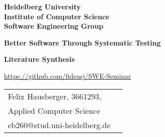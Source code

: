 \documentclass[
     12pt,         %
     a4paper,      %
     BCOR10mm,     %
     DIV14,        %
     ]{article}
\begin{document}
\begin{titlepage}

\vspace*{1cm}
\begin{center}
\textbf{ 
\Large Heidelberg University\\
\smallskip
\Large Institute of Computer Science\\
\smallskip
\Large Software Engineering Group\\
\smallskip
}

\vspace{3cm}

\textbf{\large Better Software Through Systematic Testing}

\vspace{0.5\baselineskip}
{\huge
\textbf{Literature Synthesis}
}
\vspace{0.5cm}

\url{https://github.com/fidsusj/SWE-Seminar}

\vspace{0.5cm}

{\small
	\begin{tabular}[l]{ll}
		Felix Hausberger, 3661293,\\
		Applied Computer Science\\
		eb260@stud.uni-heidelberg.de\\
	\end{tabular}
}
\end{center}



\end{titlepage}









\newpage
\printbibliography
\end{document}
